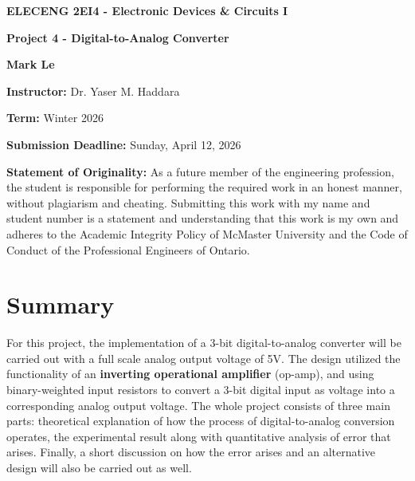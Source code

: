 \documentclass[12pt]{article}
\begin{document}
    
    \begin{titlepage}
    \begin{center}
    \vspace*{\fill}

    {\LARGE \textbf{ELECENG 2EI4 - Electronic Devices \& Circuits I}\par}
    \vspace{2.5cm}

    {\LARGE\bfseries Project 4 - Digital-to-Analog Converter\par}
    \vspace{2.5cm}
    
    {\Large \textbf{Mark Le}\par}
    \vspace{2.5cm}
    
    {\large \textbf{Instructor:} Dr. Yaser M. Haddara\par}
    \vspace{0.5cm}
    {\large \textbf{Term:} Winter 2026 \par}
    \vspace{0.5cm}
    
    {\large \textbf{Submission Deadline:} Sunday, April 12, 2026\par}
    \end{center}

    \vspace*{\fill}

    \textbf{Statement of Originality:} As a future member of the engineering profession, the student is responsible for performing the required work in an honest manner, without plagiarism and cheating. Submitting this work with my name and student number is a statement and understanding that this work is my own and adheres to the Academic Integrity Policy of McMaster University and the Code of Conduct of the Professional Engineers of Ontario.

\end{titlepage}

    \newpage
    \tableofcontents

    \listoffigures

    \listoftables

    \newpage
    \section{Summary}

    For this project, the implementation of a 3-bit digital-to-analog converter will be carried out with a full scale analog output voltage of 5V. The design utilized the functionality of an \textbf{inverting operational amplifier} (op-amp), and using binary-weighted input resistors to convert a 3-bit digital input as voltage into a corresponding analog output voltage. The whole project consists of three main parts: theoretical explanation of how the process of digital-to-analog conversion operates, the experimental result along with quantitative analysis of error that arises. Finally, a short discussion on how the error arises and an alternative design will also be carried out as well. 
\end{document}
